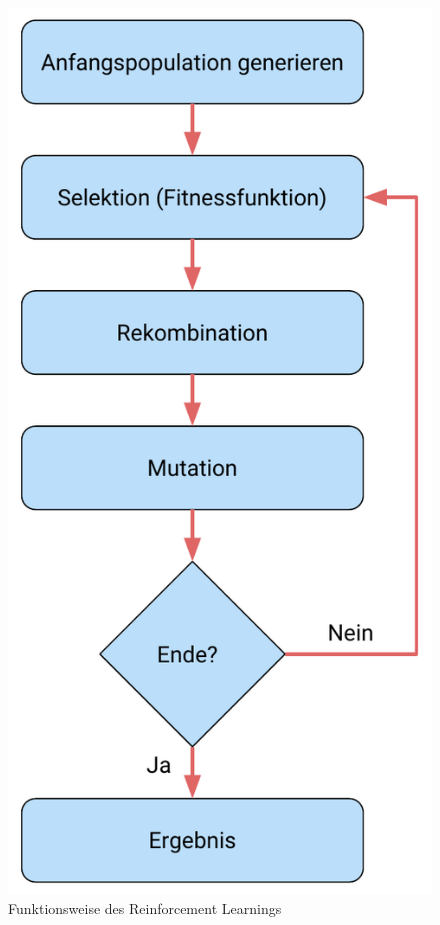 \begin{figure}[h]
    \centering
    \includegraphics[scale=0.55]{images/kapitel_2/reinforcement_learning.pdf}
    \caption{Funktionsweise des Reinforcement Learnings}
    \label{fig:grundlagen_reinforcement_learning}
\end{figure}

